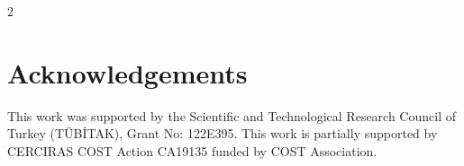 \documentclass[a0,portrait]{a0poster}
\begin{document}
\begin{multicols}{2}

\color{SaddleBrown} %



\color{DarkSlateGray} %



\nocite{*} %


\section*{Acknowledgements}

This work was supported by the Scientific and Technological Research Council of Turkey (TÜBİTAK), Grant No: 122E395. This work is partially supported by CERCIRAS COST Action CA19135 funded by COST Association.


\end{multicols}
\end{document}

